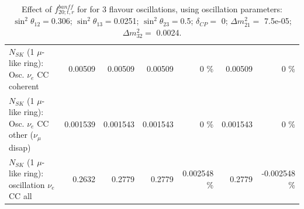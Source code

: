 \begin{table}
\begin{tabular}{| l | r | r | r  r | r  r |}
                          $N_{SK}$ (1 $\mu$-like ring): Osc. $\nu_e$ CC coherent &         0.00509 &         0.00509 &         0.00509 &        0 \%  &         0.00509 &        0 \%  \\ 
           $N_{SK}$ (1 $\mu$-like ring): Osc. $\nu_e$ CC other ($\nu_\mu$ disap) &        0.001539 &        0.001543 &        0.001543 &        0 \%  &        0.001543 &        0 \%  \\ 
                        $N_{SK}$ (1 $\mu$-like ring): oscillation $\nu_e$ CC all &          0.2632 &          0.2779 &          0.2779 & 0.002548 \%  &          0.2779 & -0.002548 \%  \\ 
\hline
\hline
\end{tabular}
\caption{ Effect of $f_{20; t, r}^{banff}$ for for 3 flavour oscillations, using oscillation parameters:  $\sin^2\theta_{12} = $0.306; $\sin^2\theta_{13} = $0.0251; $\sin^2\theta_{23} = $0.5; $\delta_{CP} = $        0; $\Delta m^2_{21} = $    7.5e-05; $\Delta m^2_{32} = $    0.0024. }
\label{tab:num_banff_ccqeE2_1RmuT_3f_osc_t13:0.0251}
\end{table}
\clearpage
